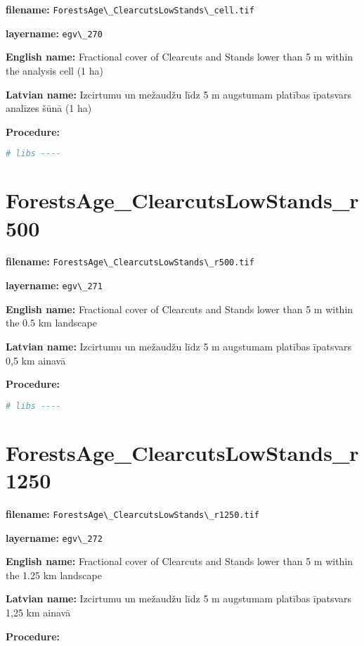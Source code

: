 \documentclass[
]{book}
\newcommand{\passthrough}[1]{#1}
\begin{document}
\textbf{filename:} \passthrough{\lstinline!ForestsAge\_ClearcutsLowStands\_cell.tif!}

\textbf{layername:} \passthrough{\lstinline!egv\_270!}

\textbf{English name:} Fractional cover of Clearcuts and Stands lower than 5 m within the analysis cell (1 ha)

\textbf{Latvian name:} Izcirtumu un mežaudžu līdz 5 m augstumam platības īpatsvars analīzes šūnā (1 ha)

\textbf{Procedure:}

\begin{lstlisting}[language=R]
# libs ----
\end{lstlisting}

\section{ForestsAge\_ClearcutsLowStands\_r500}\label{ch06.271}

\textbf{filename:} \passthrough{\lstinline!ForestsAge\_ClearcutsLowStands\_r500.tif!}

\textbf{layername:} \passthrough{\lstinline!egv\_271!}

\textbf{English name:} Fractional cover of Clearcuts and Stands lower than 5 m within the 0.5 km landscape

\textbf{Latvian name:} Izcirtumu un mežaudžu līdz 5 m augstumam platības īpatsvars 0,5 km ainavā

\textbf{Procedure:}

\begin{lstlisting}[language=R]
# libs ----
\end{lstlisting}

\section{ForestsAge\_ClearcutsLowStands\_r1250}\label{ch06.272}

\textbf{filename:} \passthrough{\lstinline!ForestsAge\_ClearcutsLowStands\_r1250.tif!}

\textbf{layername:} \passthrough{\lstinline!egv\_272!}

\textbf{English name:} Fractional cover of Clearcuts and Stands lower than 5 m within the 1.25 km landscape

\textbf{Latvian name:} Izcirtumu un mežaudžu līdz 5 m augstumam platības īpatsvars 1,25 km ainavā

\textbf{Procedure:}
\end{document}
